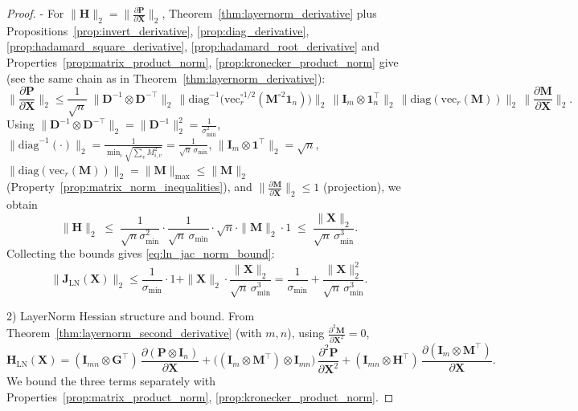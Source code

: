 \documentclass{article}
\begin{document}
\begin{proof}
- For $\|\mathbf{H}\|_2=\big\|\tfrac{\partial \mathbf{P}}{\partial \mathbf{X}}\big\|_2$, Theorem~\ref{thm:layernorm_derivative} plus Propositions~\ref{prop:invert_derivative}, \ref{prop:diag_derivative}, \ref{prop:hadamard_square_derivative}, \ref{prop:hadamard_root_derivative} and Properties~\ref{prop:matrix_product_norm}, \ref{prop:kronecker_product_norm} give (see the same chain as in Theorem~\ref{thm:layernorm_derivative}):
\[
\Big\|\frac{\partial \mathbf{P}}{\partial \mathbf{X}}\Big\|_2
\le \frac{1}{\sqrt{n}}\;\|\mathbf{D}^{-1}\otimes \mathbf{D}^{-\top}\|_2\,
\Big\|\mathrm{diag}^{-1}\!\big(\mathrm{vec}_r^{\circ 1/2}(\mathbf{M}^{\circ 2}\mathbf{1}_n)\big)\Big\|_2\,
\|\mathbf{I}_m\otimes \mathbf{1}_n^\top\|_2\,\|\mathrm{diag}(\mathrm{vec}_r(\mathbf{M}))\|_2\,
\Big\|\frac{\partial \mathbf{M}}{\partial \mathbf{X}}\Big\|_2.
\]
Using $\|\mathbf{D}^{-1}\otimes \mathbf{D}^{-\top}\|_2=\|\mathbf{D}^{-1}\|_2^2=\frac{1}{\sigma_{\min}^{2}}$, 
$\big\|\mathrm{diag}^{-1}(\cdot)\big\|_2 = \frac{1}{\min_i\sqrt{\sum_{v} M_{i,v}^2}} = \frac{1}{\sqrt{n}\,\sigma_{\min}}$,\newline
$\|\mathbf{I}_m\otimes \mathbf{1}^\top\|_2=\sqrt{n}$,
$\|\mathrm{diag}(\mathrm{vec}_r(\mathbf{M}))\|_2=\|\mathbf{M}\|_{\max}\le \|\mathbf{M}\|_2$ (Property~\ref{prop:matrix_norm_inequalities}),
and $\big\|\tfrac{\partial \mathbf{M}}{\partial \mathbf{X}}\big\|_2\le 1$ (projection), we obtain
\[\|\mathbf{H}\|_2 \;\le\; \frac{1}{\sqrt{n}\sigma_{\min}^{2}}\cdot \frac{1}{\sqrt{n}\,\sigma_{\min}}\cdot \sqrt{n}\cdot \|\mathbf{M}\|_2\cdot 1\;\le\; \frac{\|\mathbf{X}\|_2}{\sqrt{n}\,\sigma_{\min}^3}.\]
Collecting the bounds gives \eqref{eq:ln_jac_norm_bound}:
\[
\|\mathbf{J}_{\mathrm{LN}}(\mathbf{X})\|_2
\le \frac{1}{\sigma_{\min}}\cdot 1 + \|\mathbf{X}\|_2\cdot \frac{\|\mathbf{X}\|_2}{\sqrt{n}\,\sigma_{\min}^3}
= \frac{1}{\sigma_{\min}} + \frac{\|\mathbf{X}\|_2^2}{\sqrt{n}\,\sigma_{\min}^3}.
\]

2) LayerNorm Hessian structure and bound.
From Theorem~\ref{thm:layernorm_second_derivative} (with $m,n$), using $\tfrac{\partial^2 \mathbf{M}}{\partial \mathbf{X}^2}=0$,
\[\mathbf{H}_{\mathrm{LN}}(\mathbf{X})=(\mathbf{I}_{mn}\otimes \mathbf{G}^\top)\,\frac{\partial (\mathbf{P}\otimes \mathbf{I}_n)}{\partial \mathbf{X}}+ \big( (\mathbf{I}_m\otimes \mathbf{M}^\top)\otimes \mathbf{I}_{mn}\big)\,\frac{\partial^2 \mathbf{P}}{\partial \mathbf{X}^2}+ (\mathbf{I}_{mn}\otimes \mathbf{H}^\top)\,\frac{\partial (\mathbf{I}_m\otimes \mathbf{M}^\top)}{\partial \mathbf{X}}.\]
We bound the three terms separately with Properties~\ref{prop:matrix_product_norm}, \ref{prop:kronecker_product_norm}.


\end{proof}
\end{document}
